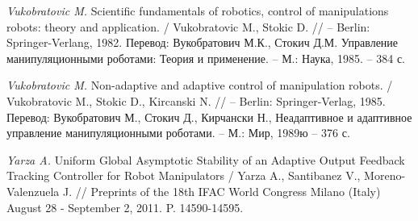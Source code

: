 \begin{thebibliography}{10}
	{\it Vukobratovic M.} Scientific fundamentals of robotics, control of manipulations robots: theory and application. / Vukobratovic M., Stokic 		D. // – Berlin: Springer-Verlang, 1982. Перевод: Вукобратович М.К., Стокич Д.М. Управление манипуляционными роботами: Теория и применение. – М.: 	Наука, 1985. – 384 с.
	
	{\it Vukobratovic M.} Non-adaptive and adaptive control of manipulation robots. / Vukobratovic M., Stokic D., Kircanski N. // – Berlin: 			Springer-Verlag, 1985. Перевод: Вукобратович М., Стокич Д., Кирчански Н., Неадаптивное и адаптивное управление манипуляционными роботами. – М.: 	Мир, 1989ю – 376 с.
	
	{\it Yarza A.} Uniform Global Asymptotic Stability of an Adaptive Output Feedback Tracking Controller for Robot Manipulators / Yarza A., 		Santibanez V., Moreno-Valenzuela J. // Preprints of the 18th IFAC World Congress Milano (Italy) August 28 - September 2, 2011. P. 14590-14595. 
	
	
\end{thebibliography} 